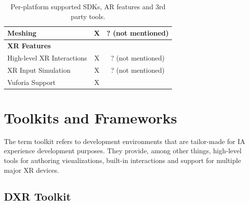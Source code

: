 \documentclass{vgtc}                          %
\begin{document}
\begin{table}[ht!]
\begin{tabular}{l c c}
		Meshing                       & X                                     & ? (not mentioned) \\
		\midrule
		\textbf{XR Features}          &                                       &                   \\
		\midrule
		High-level XR Interactions    & X                                     & ? (not mentioned) \\
		XR Input Simulation           & X                                     & ? (not mentioned) \\
		\midrule
		Vuforia Support               & X                                     &                   \\
		\bottomrule
	\end{tabular}


	\medskip

	\caption{Per-platform supported SDKs, AR features and 3rd party tools.}
	\label{table:1}
\end{table}

\section{Toolkits and Frameworks}

The term toolkit refers to development environments that are tailor-made for
IA experience development purposes. They provide, among other things,
high-level tools for authoring visualizations, built-in interactions and
support for multiple major XR devices.

\subsection{DXR Toolkit}
\end{document}
